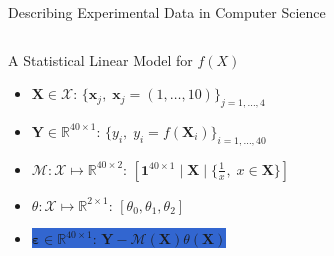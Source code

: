 \documentclass[10pt, compress, aspectratio=169, xcolor={table,usenames,dvipsnames}]{beamer}
\begin{document}
\begin{frame}[label={sec:org7ba86d2}]{Describing Experimental Data in Computer Science}
\begin{columns}
\begin{column}{0.5\columnwidth}
\begin{block}{A Statistical Linear Model for \(f(X)\)}
{\begin{itemize}
\item \(\mathbf{X} \in \mathcal{X}\): \(\{\mathbf{x}_j, \; \mathbf{x}_j = (1,\dots,10)\}_{j = 1,\dots,4}\)
\item \(\mathbf{Y} \in \mathbb{R}^{40\times{}1}\): \(\{y_i, \; y_i = f(\mathbf{X}_i)\}_{i = 1,\dots,40}\)
\item \(\mathcal{M}: \mathcal{X} \mapsto \mathbb{R}^{40\times{}2}\): \(\left[ \mathbf{1}^{40\times{}1} \; | \; \mathbf{X} \; | \; \{\frac{1}{x}^{}, \; x \in \mathbf{X}\} \right]\)
\item \(\theta: \mathcal{X} \mapsto \mathbb{R}^{2\times{}1}\): \([\theta_{0}, \theta_{1}, \theta_{2}]\)
\item \colorbox{Highlight}{$\boldsymbol{\varepsilon} \in \mathbb{R}^{40\times{}1}$: $\mathbf{Y} - \mathcal{M}(\mathbf{X})\theta(\mathbf{X})$}
\end{itemize}
}
\end{block}
\end{column}

\begin{column}{0.5\columnwidth}


\end{column}
\end{columns}
\end{frame}
\end{document}
